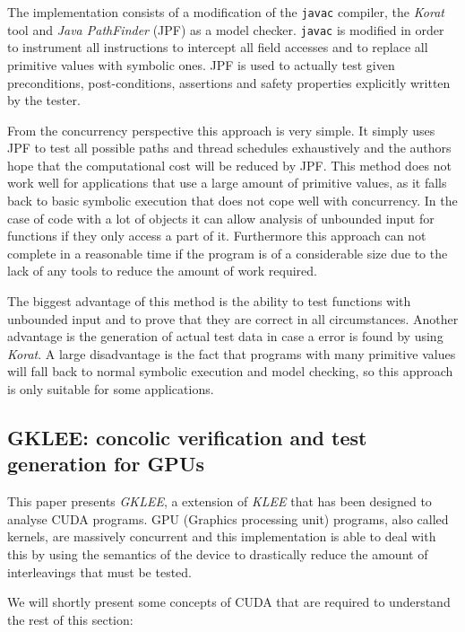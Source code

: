 \documentclass[10pt]{llncs}
\begin{document}
The implementation consists of a modification of the \texttt{javac} compiler, the \emph{Korat} tool \cite{korat} and \emph{Java PathFinder} (JPF) \cite{pathfinder} as a model checker. \texttt{javac} is modified in order to instrument all instructions to intercept all field accesses and to replace all primitive values with symbolic ones. JPF is used to actually test given preconditions, post-conditions, assertions and safety properties explicitly written by the tester.

From the concurrency perspective this approach is very simple. It simply uses JPF to test all possible paths and thread schedules exhaustively and the authors hope that the computational cost will be reduced by JPF. This method does not work well for applications that use a large amount of primitive values, as it falls back to basic symbolic execution that does not cope well with concurrency. In the case of code with a lot of objects it can allow analysis of unbounded input for functions if they only access a part of it. Furthermore this approach can not complete in a reasonable time if the program is of a considerable size due to the lack of any tools to reduce the amount of work required.

The biggest advantage of this method is the ability to test functions with unbounded input and to prove that they are correct in all circumstances. Another advantage is the generation of actual test data in case a error is found by using \emph{Korat}. A large disadvantage is the fact that programs with many primitive values will fall back to normal symbolic execution and model checking, so this approach is only suitable for some applications.

\subsection{GKLEE: concolic verification and test generation for GPUs \cite{base7}}
\label{approach3}

This paper presents \emph{GKLEE}, a extension of \emph{KLEE} \cite{klee} that has been designed to analyse CUDA \cite{cuda} programs. GPU (Graphics processing unit) programs, also called kernels, are massively concurrent and this implementation is able to deal with this by using the semantics of the device to drastically reduce the amount of interleavings that must be tested.

We will shortly present some concepts of CUDA that are required to understand the rest of this section:
\end{document}
